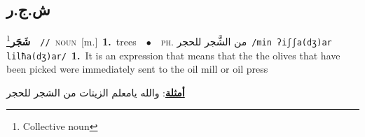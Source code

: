 \documentclass[10pt,a4paper,twoside]{article} %
\begin{document}
\begin{multicols}{2}
\vspace{-3mm}
\subsection*{\color{blue}\foreignlanguage{arabic}{ش.ج.ر}\color{blue}{}} 

{\setlength\topsep{0pt}\textbf{\foreignlanguage{arabic}{شَجَر}}\footnote{Collective noun}\ \ {\color{gray}\texttt{//}\color{black}}\ \textsc{noun}\ [m.]\ \textbf{1.}~trees\ \ $\bullet$\ \ \textsc{ph.} \color{gray} \foreignlanguage{arabic}{من الشَّجر للحجر}\color{black}\ {\color{gray}\texttt{/{\sffamily min ʔiʃʃa(dʒ)ar lilħa(dʒ)ar}/}\color{black}}\ \textbf{1.}~It is an expression that means that the the olives that have been picked were immediately sent to the oil mill or oil press\  \begin{flushright}\color{gray}\foreignlanguage{arabic}{\textbf{\underline{\foreignlanguage{arabic}{أمثلة}}}: والله يامعلم الزيتات من الشجر للحجر}\end{flushright}\color{black}} \vspace{2mm}


\end{multicols}
\end{document}
